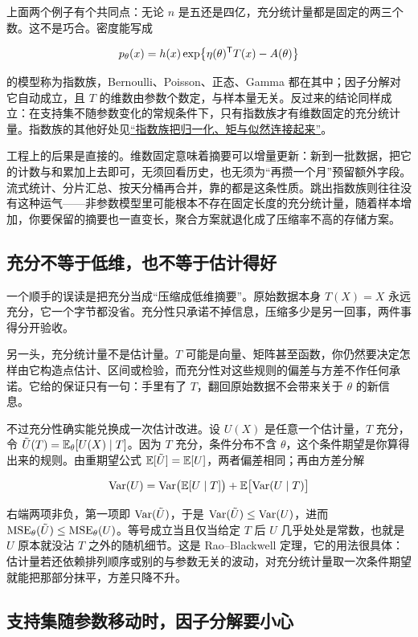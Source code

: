 上面两个例子有个共同点：无论 \(n\) 是五还是四亿，充分统计量都是固定的两三个数。这不是巧合。密度能写成

\[
p_\theta(x)=h(x)\exp\bigl\{\eta(\theta)^{\mathsf{T}}T(x)-A(\theta)\bigr\}
\]

的模型称为指数族，Bernoulli、Poisson、正态、Gamma 都在其中；因子分解对它自动成立，且 \(T\) 的维数由参数个数定，与样本量无关。反过来的结论同样成立：在支持集不随参数变化的常规条件下，只有指数族才有维数固定的充分统计量。指数族的其他好处见\hyperref[sec:13-Machine-Learning/06-Probabilistic-Models/06]{``指数族把归一化、矩与似然连接起来''}。

工程上的后果是直接的。维数固定意味着摘要可以增量更新：新到一批数据，把它的计数与和累加上去即可，无须回看历史，也无须为``再攒一个月''预留额外字段。流式统计、分片汇总、按天分桶再合并，靠的都是这条性质。跳出指数族则往往没有这种运气——非参数模型里可能根本不存在固定长度的充分统计量，随着样本增加，你要保留的摘要也一直变长，聚合方案就退化成了压缩率不高的存储方案。

\subsection{充分不等于低维，也不等于估计得好}

一个顺手的误读是把充分当成``压缩成低维摘要''。原始数据本身 \(T(X)=X\) 永远充分，它一个字节都没省。充分性只承诺不掉信息，压缩多少是另一回事，两件事得分开验收。

另一头，充分统计量不是估计量。\(T\) 可能是向量、矩阵甚至函数，你仍然要决定怎样由它构造点估计、区间或检验，而充分性对这些规则的偏差与方差不作任何承诺。它给的保证只有一句：手里有了 \(T\)，翻回原始数据不会带来关于 \(\theta\) 的新信息。

不过充分性确实能兑换成一次估计改进。设 \(U(X)\) 是任意一个估计量，\(T\) 充分，令 \(\tilde U(T)=\mathbb{E}_\theta[U(X)\mid T]\)。因为 \(T\) 充分，条件分布不含 \(\theta\)，这个条件期望是你算得出来的规则。由重期望公式 \(\mathbb{E}[\tilde U]=\mathbb{E}[U]\)，两者偏差相同；再由方差分解

\[
\operatorname{Var}(U)=\operatorname{Var}\bigl(\mathbb{E}[U\mid T]\bigr)+\mathbb{E}\bigl[\operatorname{Var}(U\mid T)\bigr]
\]

右端两项非负，第一项即 \(\operatorname{Var}(\tilde U)\)，于是 \(\operatorname{Var}(\tilde U)\le\operatorname{Var}(U)\)，进而 \(\operatorname{MSE}_\theta(\tilde U)\le\operatorname{MSE}_\theta(U)\)。等号成立当且仅当给定 \(T\) 后 \(U\) 几乎处处是常数，也就是 \(U\) 原本就没沾 \(T\) 之外的随机细节。这是 Rao--Blackwell 定理，它的用法很具体：估计量若还依赖排列顺序或别的与参数无关的波动，对充分统计量取一次条件期望就能把那部分抹平，方差只降不升。

\subsection{支持集随参数移动时，因子分解要小心}

